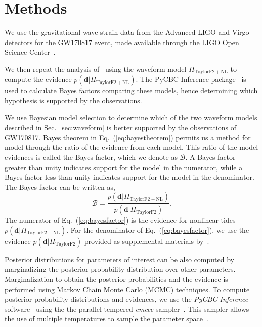 \section{Methods} \label{sec:methods}
We use the gravitational-wave strain data from the Advanced LIGO and Virgo detectors for the GW170817 event, made available through the LIGO Open Science Center~\citep{Vallisneri:2014vxa,gw170817-losc}.

We then repeat the analysis of~\cite{de2018tidal} using the waveform model $H_\mathrm{TaylorF2+NL}$ to compute the evidence $p(\mathbf{d}|H_\mathrm{TaylorF2+NL})$.
The PyCBC Inference package~\citep{alex_nitz_2018_1208115,biwer2019pycbc} is used
to calculate Bayes factors comparing these models, hence determining which
hypothesis is supported by the observations. 

We use Bayesian model selection to determine which of the two waveform models described in Sec.~\ref{sec:waveform} is better supported by the observations of GW170817. Bayes theorem in Eq.~(\ref{eq:bayestheorem}) permits us a method for model  through the ratio of the evidence from each model. This ratio of the model evidences is called the Bayes factor, which we denote as $\mathcal{B}$. A Bayes factor greater than unity indicates support for the model in the numerator, while a Bayes factor less than unity indicates support for the model in the denominator. The Bayes factor can be written as,
\begin{equation}
\mathcal{B} = \frac{p\left(\mathbf{d}|H_\mathrm{TaylorF2+NL}\right)}{p\left(\mathbf{d}|H_\mathrm{TaylorF2}\right)}.
\label{eq:bayesfactor}
\end{equation}
The numerator of Eq.~(\ref{eq:bayesfactor}) is the evidence for nonlinear tides $p\left(\mathbf{d}|H_\mathrm{TaylorF2+NL}\right)$. For the denominator of Eq.~(\ref{eq:bayesfactor}), we use the evidence $p(\mathbf{d}|H_\mathrm{TaylorF2})$ provided as supplemental materials by~\citep{de2018tidal}.

Posterior distributions for parameters of interest can be also computed by marginalizing the posterior probability distribution over other parameters.  Marginalization to obtain the posterior probabilities and the evidence is performed using Markov Chain Monte Carlo (MCMC) techniques. To compute posterior probability distributions and evidences, we use the \emph{PyCBC Inference} software~\citep{alex_nitz_2018_1208115,biwer2019pycbc} using the the parallel-tempered \emph{emcee} sampler~\citep{emcee,vousden:2016}.
This sampler allows the use of multiple temperatures to sample the parameter space~\citep{emcee, doi:10.1143/PTPS.157.317, B509983H}.

